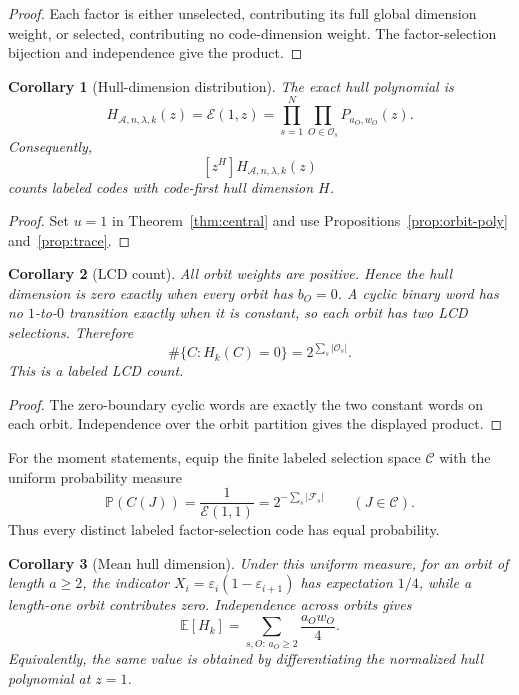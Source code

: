 \documentclass[11pt]{article}
\newcommand{\A}{\mathcal A}
\newcommand{\Fs}{\mathcal F_s}
\newcommand{\Os}{\mathcal O_s}
\newcommand{\Epoly}{\mathscr E}
\theoremstyle{plain}
\newtheorem{corollary}{Corollary}[section]
\theoremstyle{definition}
\theoremstyle{remark}
\begin{document}
\begin{proof}
Each factor is either unselected, contributing its full global dimension weight, or selected, contributing no code-dimension weight. The factor-selection bijection and independence give the product.
\end{proof}

\begin{corollary}[Hull-dimension distribution]\label{cor:hull-dist}
The exact hull polynomial is
\begin{equation}\label{eq:hull-dist}
H_{\A,n,\lambda,k}(z)=\Epoly(1,z)
 =\prod_{s=1}^{N}\prod_{O\in\Os}P_{a_O,w_O}(z).
\end{equation}
Consequently,
\[
[z^H]H_{\A,n,\lambda,k}(z)
\]
counts labeled codes with code-first hull dimension $H$.
\end{corollary}

\begin{proof}
Set $u=1$ in Theorem~\ref{thm:central} and use Propositions~\ref{prop:orbit-poly} and~\ref{prop:trace}.
\end{proof}

\begin{corollary}[LCD count]\label{cor:lcd}
All orbit weights are positive. Hence the hull dimension is zero exactly when every orbit has $b_O=0$. A cyclic binary word has no $1$-to-$0$ transition exactly when it is constant, so each orbit has two LCD selections. Therefore
\begin{equation}
\#\{C:H_k(C)=0\}=2^{\sum_s|\Os|}.
\end{equation}
This is a labeled LCD count.
\end{corollary}

\begin{proof}
The zero-boundary cyclic words are exactly the two constant words on each orbit. Independence over the orbit partition gives the displayed product.
\end{proof}

For the moment statements, equip the finite labeled selection space $\mathscr C$ with the uniform probability measure
\[
\mathbb P(C(J))=\frac{1}{\Epoly(1,1)}
 =2^{-\sum_s|\Fs|}
\qquad(J\in\mathscr C).
\]
Thus every distinct labeled factor-selection code has equal probability.

\begin{corollary}[Mean hull dimension]\label{cor:mean}
Under this uniform measure, for an orbit of length $a\geq2$, the indicator $X_i=\varepsilon_i(1-\varepsilon_{i+1})$ has expectation $1/4$, while a length-one orbit contributes zero. Independence across orbits gives
\begin{equation}
\mathbb E[H_k]
 =\sum_{s,O:\,a_O\geq2}\frac{a_Ow_O}{4}.
\end{equation}
Equivalently, the same value is obtained by differentiating the normalized hull polynomial at $z=1$.
\end{corollary}
\end{document}
